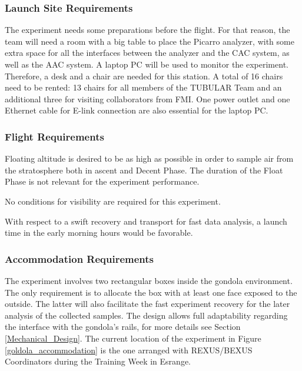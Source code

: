 \documentclass[a4paper,12pt,oneside]{article} %
\begin{document}
\subsubsection{Launch Site Requirements}
The experiment needs some preparations before the flight. For that reason, the team will need a room with a big table to place the Picarro analyzer, with some extra space for all the interfaces between the analyzer and the CAC system, as well as the AAC system.
A laptop PC will be used to monitor the experiment. Therefore, a desk and a chair are needed for this station. A total of 16 chairs need to be rented: 13 chairs for all members of the TUBULAR Team and an additional three for visiting collaborators from FMI. One power outlet and one Ethernet cable for E-link connection are also essential for the laptop PC.

\subsubsection{Flight Requirements}

Floating altitude is desired to be as high as possible in order to sample air from the stratosphere both in ascent and Decent Phase. The duration of the Float Phase is not relevant for the experiment performance. 

\smallskip
No conditions for visibility are required for this experiment.

\smallskip
With respect to a swift recovery and transport for fast data analysis, a launch time in the early morning hours would be favorable.

\pagebreak
\subsubsection{Accommodation Requirements}

The experiment involves two rectangular boxes inside the gondola environment. The only requirement is to allocate the box with at least one face exposed to the outside. The latter will also facilitate the fast experiment recovery for the later analysis of the collected samples. The design allows full adaptability regarding the interface with the gondola's rails, for more details see Section \ref{Mechanical_Design}. The current location of the experiment in Figure \ref{goldola_accommodation} is the one arranged with REXUS/BEXUS Coordinators during the Training Week in Esrange.
\end{document}
